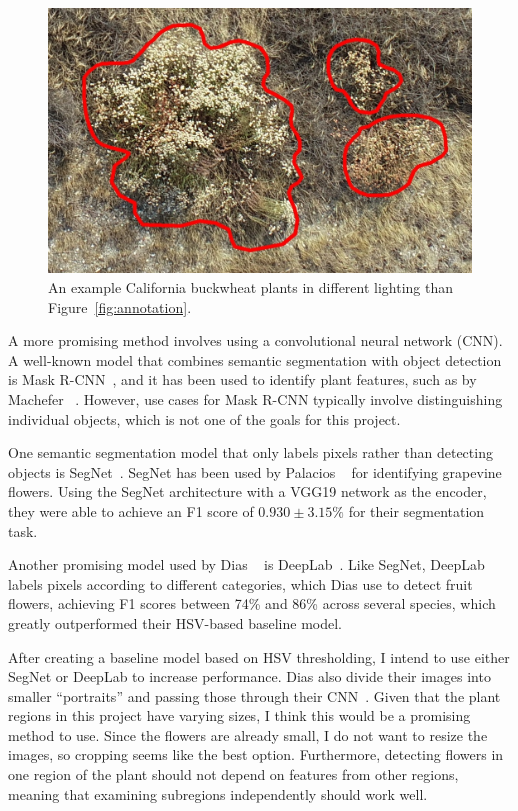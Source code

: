 \documentclass[10pt,twocolumn,letterpaper]{article}
\begin{document}
\begin{figure}[t]
  \centering
   \includegraphics[width=0.9\linewidth]{annotation2.jpg}
   \caption{An example California buckwheat plants in different lighting than Figure~\ref{fig:annotation}.}
   \label{fig:annotation2}
\end{figure}

A more promising method involves using a convolutional neural network (CNN). A well-known model that combines semantic segmentation with object detection is Mask R-CNN~\cite{He}, and it has been used to identify plant features, such as by Machefer \etal~\cite{Machefer}. However, use cases for Mask R-CNN typically involve distinguishing individual objects, which is not one of the goals for this project.

One semantic segmentation model that only labels pixels rather than detecting objects is SegNet~\cite{Segnet}. SegNet has been used by Palacios \etal~\cite{Palacios} for identifying grapevine flowers. Using the SegNet architecture with a VGG19 network as the encoder, they were able to achieve an F1 score of $0.930 \pm 3.15\%$ for their segmentation task.

Another promising model used by Dias \etal~\cite{Dias} is DeepLab~\cite{Deeplab}. Like SegNet, DeepLab labels pixels according to different categories, which Dias \etal use to detect fruit flowers, achieving F1 scores between 74\% and 86\% across several species, which greatly outperformed their HSV-based baseline model.

After creating a baseline model based on HSV thresholding, I intend to use either SegNet or DeepLab to increase performance. Dias \etal also divide their images into smaller ``portraits'' and passing those through their CNN~\cite{Dias}. Given that the plant regions in this project have varying sizes, I think this would be a promising method to use. Since the flowers are already small, I do not want to resize the images, so cropping seems like the best option. Furthermore, detecting flowers in one region of the plant should not depend on features from other regions, meaning that examining subregions independently should work well.
\end{document}
